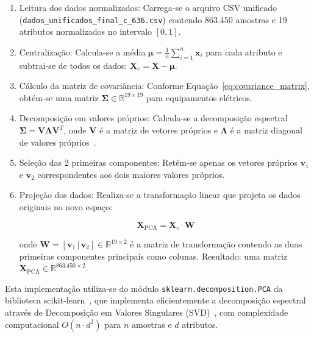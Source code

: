 \begin{enumerate}
    \item Leitura dos dados normalizados: Carrega-se o arquivo CSV unificado (\texttt{dados\_\allowbreak unificados\_\allowbreak final\_c\_636.csv}) contendo 863.450 amostras e 19 atributos normalizados no intervalo $[0,1]$.

    \item Centralização: Calcula-se a média $\boldsymbol{\mu} = \frac{1}{n} \sum_{i=1}^{n} \mathbf{x}_i$ para cada atributo e subtrai-se de todos os dados: $\mathbf{X}_c = \mathbf{X} - \boldsymbol{\mu}$.

    \item Cálculo da matriz de covariância: Conforme Equação~\ref{eq:covariance_matrix}, obtém-se uma matriz $\mathbf{\Sigma} \in \mathbb{R}^{19 \times 19}$ para equipamentos elétricos.

    \item Decomposição em valores próprios: Calcula-se a decomposição espectral $\mathbf{\Sigma} = \mathbf{V} \boldsymbol{\Lambda} \mathbf{V}^T$, onde $\mathbf{V}$ é a matriz de vetores próprios e $\boldsymbol{\Lambda}$ é a matriz diagonal de valores próprios~\cite{jolliffe2002principal}.

    \item Seleção das 2 primeiras componentes: Retém-se apenas os vetores próprios $\mathbf{v}_1$ e $\mathbf{v}_2$ correspondentes aos dois maiores valores próprios.

    \item Projeção dos dados: Realiza-se a transformação linear que projeta os dados originais no novo espaço:

          \begin{equation}
              \mathbf{X}_{\text{PCA}} = \mathbf{X}_c \cdot \mathbf{W}
              \label{eq:pca_projection}
          \end{equation}

          onde $\mathbf{W} = [\mathbf{v}_1 \, | \, \mathbf{v}_2] \in \mathbb{R}^{19 \times 2}$ é a matriz de transformação contendo as duas primeiras componentes principais como colunas. Resultado: uma matriz $\mathbf{X}_{\text{PCA}} \in \mathbb{R}^{863.450 \times 2}$.
\end{enumerate}

Esta implementação utiliza-se do módulo \texttt{sklearn.decomposition.PCA} da biblioteca scikit-learn~\cite{pedregosa2011scikit}, que implementa eficientemente a decomposição espectral através de Decomposição em Valores Singulares (SVD)~\cite{scikit-learn-pca}, com complexidade computacional $O(n \cdot d^2)$ para $n$ amostras e $d$ atributos.

